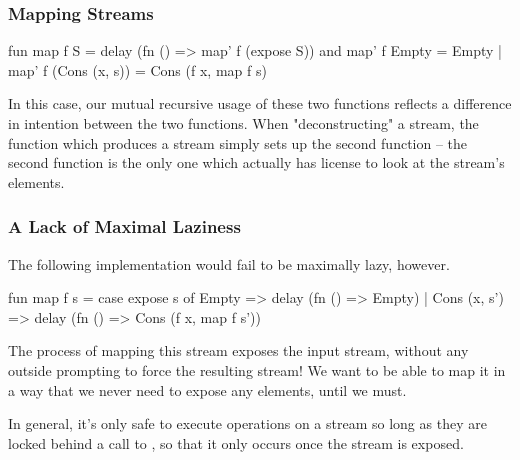 \documentclass[aspectratio=169]{beamer}
\begin{document}
\begin{frame}[fragile]
  \frametitle{Mapping Streams}

  \begin{codeblock}
    fun map  f S = delay (fn () => map' f (expose S))
    and map' f Empty = Empty
      | map' f (Cons (x, s)) = Cons (f x, map f s)
  \end{codeblock}

  \pause
  \vspace{\fill}

  In this case, our mutual recursive usage of these two functions reflects a
  difference in intention between the two functions. When "deconstructing" a
  stream, the function which produces a stream simply sets up the second
  function -- the second function is the only one which actually has license
  to look at the stream's elements.
\end{frame}

\begin{frame}[fragile]
  \frametitle{A Lack of Maximal Laziness}

  The following implementation would fail to be maximally lazy, however.

  \pause
  \vspace{\fill}

  \begin{codeblock}
    fun map f s =
      case expose s of
        Empty => delay (fn () => Empty)
      | Cons (x, s') => delay (fn () => Cons (f x, map f s'))
  \end{codeblock}

  \pause
  \vspace{\fill}

  The process of mapping this stream exposes the input stream, without any
  outside prompting to force the resulting stream! We want to be
  able to map it in a way that we never need to expose any elements, until
  we must.

  \pause
  \vspace{\fill}

  In general, it's only safe to execute operations on a stream so long as
  they are locked behind a call to , so that it only occurs
  once the stream is exposed.
\end{frame}
\end{document}
